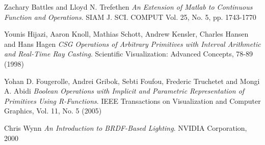 \documentclass[12pt]{amsart}
\theoremstyle{definition}
\begin{document}
\begin{thebibliography}{9}
  Zachary Battles and Lloyd N. Trefethen
  \emph{An Extension of Matlab to Continuous Function and Operations}.
  SIAM J. SCI. COMPUT Vol. 25, No. 5, pp. 1743-1770 
  
	Younis Hijazi, Aaron Knoll, Mathias Schott, Andrew Kensler, Charles Hansen and Hans Hagen
	\emph{CSG Operations of Arbitrary Primitives with Interval Arithmetic and Real-Time Ray Casting}.
  Scientific Visualization: Advanced Concepts, 78-89 (1998) 
	
	Yohan D. Fougerolle, Andrei Gribok, Sebti Foufou, Frederic Truchetet and Mongi A. Abidi
	\emph{Boolean Operations with Implicit and Parametric Representation of Primitives Using R-Functions}.
  IEEE Transactions on Visualization and Computer Graphics, Vol. 11, No. 5 (2005)
  
	Chris Wynn
	\emph{An Introduction to BRDF-Based Lighting}.
  NVIDIA Corporation, 2000
		

\end{thebibliography}
\end{document}
